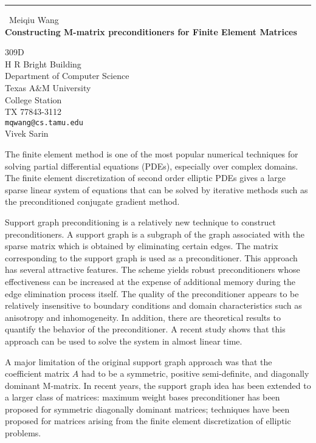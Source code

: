 \documentclass{report}
\begin{document}
\begin{center}
\rule{6in}{1pt} \
{\large Meiqiu Wang \\
{\bf Constructing M-matrix preconditioners for Finite Element Matrices}}

309D \\ H R Bright Building \\ Department of Computer Science \\ Texas A&M University \\ College Station \\ TX 77843-3112
\\
{\tt mqwang@cs.tamu.edu}\\
Vivek Sarin\end{center}

The finite element method is one of the most popular numerical techniques
for solving partial differential equations (PDEs), especially over
complex domains. The finite element discretization of second order
elliptic PDEs gives a large sparse linear system of equations that can be
solved by iterative methods such as the preconditioned conjugate gradient
method.

Support graph preconditioning is a relatively new technique to construct
preconditioners. A support graph is a subgraph of the graph associated
with the sparse matrix which is obtained by eliminating certain edges.
The matrix corresponding to the support graph is used as a
preconditioner. This approach has several attractive features. The scheme
yields robust preconditioners whose effectiveness can be increased at the
expense of additional memory during the edge elimination process itself.
The quality of the preconditioner appears to be relatively insensitive to
boundary conditions and domain characteristics such as anisotropy and
inhomogeneity. In addition, there are theoretical results to quantify the
behavior of the preconditioner. A recent study shows that this approach
can be used to solve the system in almost linear time.

A major limitation of the original support graph approach was that the
coefficient matrix $A$ had to be a symmetric, positive semi-definite, and
diagonally dominant M-matrix. In recent years, the support graph idea has
been extended to a larger class of matrices: maximum weight bases
preconditioner has been proposed for symmetric diagonally dominant
matrices; techniques have been proposed for matrices arising from the
finite element discretization of elliptic problems.
\end{document}
